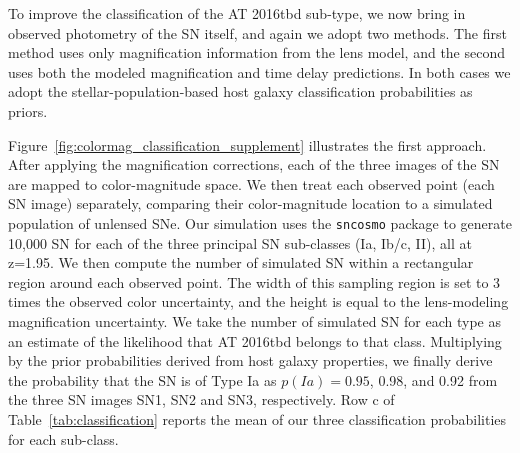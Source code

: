 \documentclass[12pt]{article}
\def\SNABC{AT 2016tbd\xspace}
\begin{document}
{To improve the classification of the \SNABC sub-type, we now bring in observed photometry of the SN itself, and again we adopt two methods.  The first method uses only magnification information from the lens model, and the second uses both the modeled magnification and time delay predictions.  In both cases we adopt the stellar-population-based host galaxy classification probabilities as priors.

Figure~\ref{fig:colormag_classification_supplement} illustrates the first approach.  After applying the magnification corrections, each of the three images of the SN are mapped to color-magnitude space.  We then treat each observed point (each SN image) separately, comparing their color-magnitude location to a simulated population of unlensed SNe.  Our simulation uses the {\tt sncosmo} package \cite{barbary_sncosmo_2016}  to generate 10,000 SN for each of the three principal SN sub-classes (Ia, Ib/c, II), all at z=1.95.  
We then compute the number of simulated SN within a rectangular region around each observed point. The width of this sampling region is set to 3 times the observed color uncertainty, and the height is equal to the lens-modeling magnification uncertainty.  We take the number of simulated SN for each type as an estimate of the likelihood that \SNABC belongs to that class. Multiplying by the prior probabilities derived from host galaxy properties, we finally derive the probability that the SN is of Type Ia as $p(Ia)=0.95$, 0.98, and 0.92 from the three SN images SN1, SN2 and SN3, respectively. Row c of Table~\ref{tab:classification} reports the mean of our three classification probabilities for each sub-class. 

}
\end{document}

